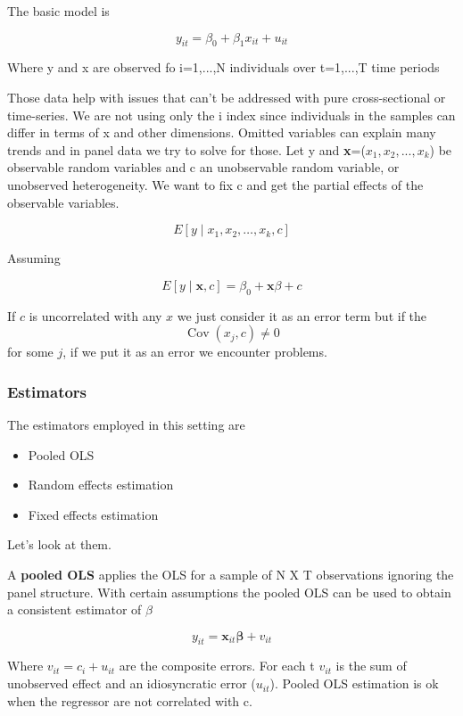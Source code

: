 The basic model is

\[
y_{it}= \beta_0 + \beta_1x_{it} + u_{it}
\]

Where y and x are observed fo i=1,...,N individuals over t=1,...,T time periods

Those data help with issues that can't be addressed with pure cross-sectional or time-series. We are not using only the i index since individuals in the samples can differ in terms of x and other dimensions. Omitted variables can explain many trends and in panel data we try to solve for those. Let y and \textbf{x}=($x_1, x_2, ..., x_k$) be observable random variables and c an unobservable random variable, or unobserved heterogeneity. We want to fix c and get the partial effects of the observable variables.

\[
E[y \mid x_1, x_2, \ldots, x_k, c]
\]

Assuming

\[
E[y \mid \mathbf{x}, c] = \beta_0 + \mathbf{x}\beta + c
\]

If \( c \) is uncorrelated with any \( x \) we just consider it as an error term but if the 
\[
\operatorname{Cov}(x_j, c) \ne 0
\]
for some \( j \), if we put it as an error we encounter problems.



\subsubsection{Estimators}

The estimators employed in this setting are 

\begin{itemize}
    \item Pooled OLS
    \item Random effects estimation
    \item Fixed effects estimation
\end{itemize}

Let's look at them.

\vspace{10pt}

A \textbf{pooled OLS} applies the OLS for a sample of N X T observations ignoring the panel structure. With certain assumptions the pooled OLS can be used to obtain a consistent estimator of $\beta$ 

\[
y_{it} = \mathbf{x}_{it}\boldsymbol{\beta} + v_{it}
\]


Where $v_{it} = c_{i} + u_{it}$ are the composite errors. For each t $v_{it}$ is the sum of unobserved effect and an idiosyncratic error ($u_{it}$). Pooled OLS estimation is ok when the regressor are not correlated with c.

